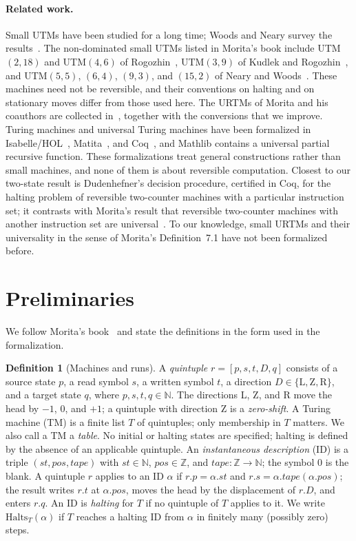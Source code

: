 \documentclass{article}
\theoremstyle{definition}
\newtheorem{definition}[theorem]{Definition}
\theoremstyle{remark}
\newcommand{\pos}{\mathit{pos}}
\newcommand{\rmL}{\mathrm{L}}
\newcommand{\rmR}{\mathrm{R}}
\newcommand{\rmZ}{\mathrm{Z}}
\begin{document}
\paragraph{Related work.}
Small UTMs have been studied for a long time; Woods and Neary survey the results~\cite{WoodsNeary09}.
The non-dominated small UTMs listed in Morita's book include UTM$(2,18)$ and UTM$(4,6)$ of Rogozhin~\cite{Rogozhin96}, UTM$(3,9)$ of Kudlek and Rogozhin~\cite{KudlekRogozhin02}, and UTM$(5,5)$, $(6,4)$, $(9,3)$, and $(15,2)$ of Neary and Woods~\cite{NearyWoods09}.
These machines need not be reversible, and their conventions on halting and on stationary moves differ from those used here.
The URTMs of Morita and his coauthors are collected in~\cite[Ch.~7]{Morita17}, together with the conversions that we improve.
Turing machines and universal Turing machines have been formalized in Isabelle/HOL~\cite{XuZhangUrban13}, Matita~\cite{AspertiRicciotti15}, and Coq~\cite{ForsterKunzeWuttke20}, and Mathlib contains a universal partial recursive function. %
These formalizations treat general constructions rather than small machines, and none of them is about reversible computation.
Closest to our two-state result is Dudenhefner's decision procedure, certified in Coq, for the halting problem of reversible two-counter machines with a particular instruction set; it contrasts with Morita's result that reversible two-counter machines with another instruction set are universal~\cite{Dudenhefner22}.
To our knowledge, small URTMs and their universality in the sense of Morita's Definition~7.1 have not been formalized before.

\section{Preliminaries}
\label{sec:prelim}

We follow Morita's book~\cite{Morita17} and state the definitions in the form used in the formalization.

\begin{definition}[Machines and runs]
A \emph{quintuple} $r=[p,s,t,D,q]$ consists of a source state $p$, a read symbol $s$, a written symbol $t$, a direction $D\in\{\rmL,\rmZ,\rmR\}$, and a target state $q$, where $p,s,t,q\in\mathbb{N}$.
The directions L, Z, and R move the head by $-1$, $0$, and $+1$; a quintuple with direction Z is a \emph{zero-shift}.
A Turing machine (TM) is a finite list $T$ of quintuples; only membership in $T$ matters. We also call a TM a \emph{table}.
No initial or halting states are specified; halting is defined by the absence of an applicable quintuple.
An \emph{instantaneous description} (ID) is a triple $(\mathit{st},\pos,\mathit{tape})$ with $\mathit{st}\in\mathbb{N}$, $\pos\in\mathbb{Z}$, and $\mathit{tape}:\mathbb{Z}\to\mathbb{N}$; the symbol 0 is the blank.
A quintuple $r$ applies to an ID $\alpha$ if $r.p=\alpha.\mathit{st}$ and $r.s=\alpha.\mathit{tape}(\alpha.\pos)$; the result writes $r.t$ at $\alpha.\pos$, moves the head by the displacement of $r.D$, and enters $r.q$.
An ID is \emph{halting} for $T$ if no quintuple of $T$ applies to it.
We write $\mathrm{Halts}_T(\alpha)$ if $T$ reaches a halting ID from $\alpha$ in finitely many (possibly zero) steps.
\end{definition}
\end{document}
